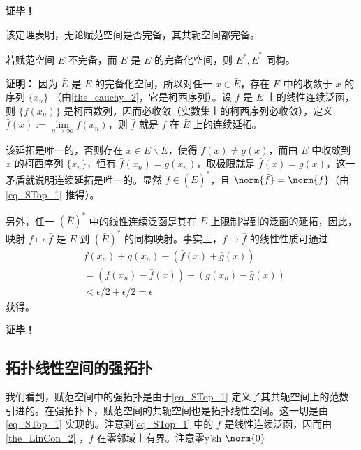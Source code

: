 \textbf{证毕！}

该定理表明，无论赋范空间是否完备，其共轭空间都完备。

\begin{theorem}{}
若赋范空间 $E$ 不完备，而 $\bar{E}$ 是 $E$ 的完备化空间，则 $E^*,\bar{E}^*$ 同构。
\end{theorem}

\textbf{证明：} 因为 $\bar{E}$ 是 $E$ 的完备化空间，所以对任一 $x\in \bar{E}$，存在 $E$ 中的收敛于 $x$ 的序列 $\{x_n\}$ （由\autoref{the_cauchy_2}，它是柯西序列）。设 $f$ 是 $E$ 上的线性连续泛函，则 $\{f(x_n)\}$ 是柯西数列，因而必收敛（实数集上的柯西序列必收敛），定义 $\bar f(x):=\lim\limits_{n\rightarrow\infty}f(x_n)$，则 $\bar f$ 就是 $f$ 在 $\bar E$ 上的连续延拓。

该延拓是唯一的，否则存在 $x\in \bar E\backslash E$，使得 $\bar f(x)\neq g(x)$，而由 $E$ 中收敛到 $x$ 的柯西序列 $\{x_n\}$，恒有 $\bar f(x_n)=g(x_n)$，取极限就是 $\bar f(x)=g(x)$，这一矛盾就说明连续延拓是唯一的。显然 $\bar f\in(\bar E)^*$，且 $\norm{\bar f}=\norm{f}$（由\autoref{eq_STop_1} 推得）。

另外，任一 $(\bar E)^*$ 中的线性连续泛函是其在 $E$ 上限制得到的泛函的延拓，因此，映射 $f\mapsto\bar f$ 是 $E$ 到 $(\bar E)^*$ 的同构映射。事实上，$f\mapsto\bar f$ 的线性性质可通过 
\begin{equation}
\begin{aligned}
&f(x_n)+g(x_n)-(\bar f(x)+\bar g(x))\\
&=(f(x_n)-\bar f(x))+(g(x_n)-\bar g(x))\\
&<\epsilon/2+\epsilon/2=\epsilon
\end{aligned}~
\end{equation}
获得。

\textbf{证毕！}



\subsection{拓扑线性空间的强拓扑}

我们看到，赋范空间中的强拓扑是由于\autoref{eq_STop_1} 定义了其共轭空间上的范数引进的。在强拓扑下，赋范空间的共轭空间也是拓扑线性空间。这一切是由\autoref{eq_STop_1} 实现的。注意到\autoref{eq_STop_1} 中的 $f$ 是线性连续泛函，因而由\autoref{the_LinCon_2} ，$f$ 在零邻域上有界。注意零y'sh $\norm{0}$

